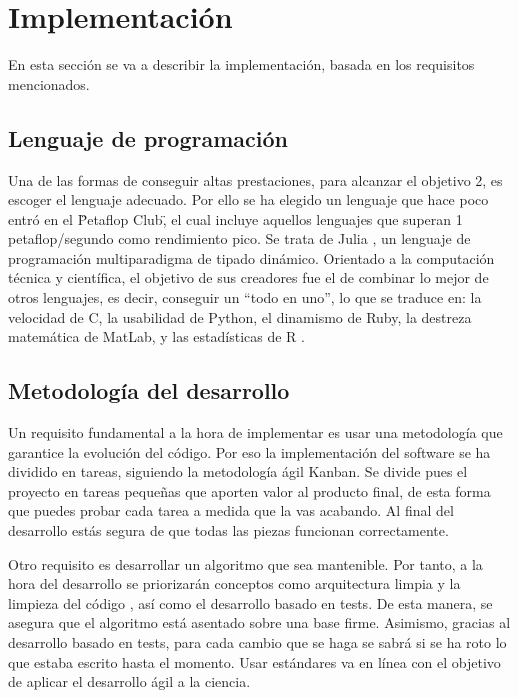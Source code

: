 \chapter{Implementación}
En esta sección se va a describir la implementación, basada en los requisitos mencionados.

\section{Lenguaje de programación}

Una de las formas de conseguir altas prestaciones, para alcanzar el objetivo 2, es escoger el lenguaje adecuado. Por ello se ha elegido
un lenguaje que hace poco entró en el \"Petaflop Club\", el cual incluye aquellos lenguajes que superan 1 petaflop/segundo como rendimiento pico. Se trata
de Julia \cite{julia}, un lenguaje de programación multiparadigma de tipado dinámico. Orientado a la computación técnica y
científica, el objetivo de sus creadores fue el de combinar lo mejor de otros lenguajes, es decir, conseguir un “todo en uno”, lo que se traduce en:
la velocidad de C, la usabilidad de Python, el dinamismo de Ruby, la destreza matemática de MatLab, y las estadísticas de R \cite{julia_goals}.

\section{Metodología del desarrollo}

Un requisito fundamental a la hora de implementar es usar una metodología que garantice la evolución del código. Por eso la implementación 
del software se ha dividido en tareas, siguiendo la metodología ágil Kanban. Se divide pues el proyecto en tareas pequeñas que aporten valor al producto 
final, de esta forma que puedes probar cada tarea a medida que la vas acabando. Al final del desarrollo estás segura de que todas las piezas funcionan
correctamente.

Otro requisito es desarrollar un algoritmo que sea mantenible. Por tanto, a la hora del desarrollo se priorizarán conceptos 
como arquitectura limpia \cite{cleanArquitecture2017} y la limpieza del código \cite{cleanCode2008}, así como el desarrollo basado en tests. De esta manera, se asegura
que el algoritmo está asentado sobre una base firme. Asimismo, gracias al desarrollo basado en tests, para cada cambio que se haga
se sabrá si se ha roto lo que estaba escrito hasta el momento.  Usar estándares va en línea con el objetivo de aplicar el desarrollo ágil a la ciencia.

